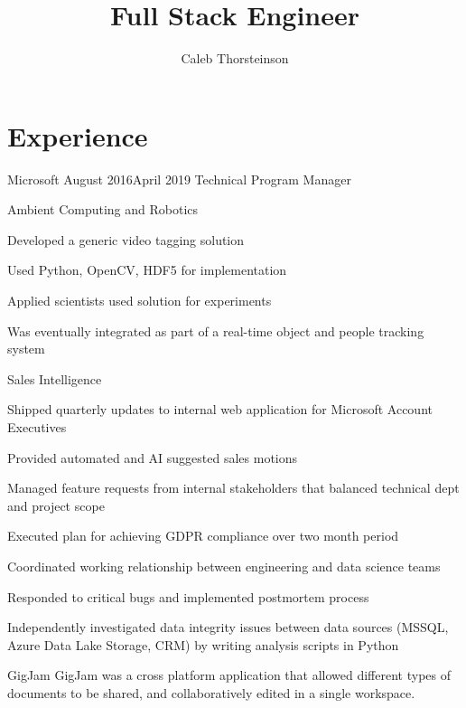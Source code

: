 \documentclass[]{resume}
\author{Caleb Thorsteinson}
\title{Full Stack Engineer}
\begin{document}
\raggedright


\section{Experience}

\begin{employer}{Microsoft} {August 2016}{April 2019}
  {Technical Program Manager}
\begin{team}{Ambient Computing and Robotics}
  \begin{bullets}
  \item Developed a generic video tagging solution
  \item Used Python, OpenCV, HDF5 for implementation
  \item Applied scientists used solution for experiments
  \item Was eventually integrated as part
    of a real-time object and people
    tracking system
  \end{bullets}
\end{team}
\begin{team}{Sales Intelligence}
  \begin{bullets}
  \item Shipped quarterly updates
    to internal web application for Microsoft Account Executives
  \item Provided automated and AI suggested sales motions
  \item Managed feature requests
    from internal stakeholders
    that balanced technical dept
    and project scope
  \item Executed plan for achieving GDPR compliance
    over two month period
  \item Coordinated working relationship
    between engineering and
    data science teams
  \item Responded to critical bugs
    and implemented postmortem process
  \item Independently investigated data integrity issues
    between data sources (MSSQL, Azure Data Lake Storage, CRM)
    by writing analysis scripts in Python
  \end{bullets}
\end{team}
\begin{team}{GigJam}
  GigJam was a cross platform application
  that allowed different types of documents
  to be shared,
  and collaboratively edited
  in a single workspace.


\end{team}
\end{employer}
\end{document}
